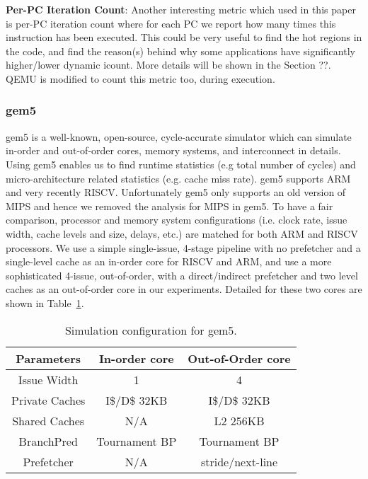 \noindent \textbf{Per-PC Iteration Count}: Another interesting metric which used in this paper is per-PC iteration count where for each PC we report how many times this instruction has been executed. This could be very useful to find the hot regions in the code, and find the reason(s) behind why some applications have significantly higher/lower dynamic icount. More details will be shown in the Section ??. QEMU is modified to count this metric too, during execution. 

\subsubsection{gem5}
gem5 is a well-known, open-source, cycle-accurate simulator which can simulate in-order and out-of-order cores, memory systems, and interconnect in details. Using gem5 enables us to find runtime statistics (e.g total number of cycles) and micro-architecture related statistics (e.g. cache miss rate). gem5 supports ARM and very recently RISCV. Unfortunately gem5 only supports an old version of MIPS and hence we removed the analysis for MIPS in gem5. To have a fair comparison, processor and memory system configurations (i.e. clock rate, issue width, cache levels and size, delays, etc.) are matched for both ARM and RISCV processors. We use a simple single-issue, 4-stage pipeline with no prefetcher and a single-level cache as an in-order core for RISCV and ARM, and use a more sophisticated 4-issue, out-of-order, with a direct/indirect prefetcher and two level caches as an out-of-order core in our experiments. Detailed for these two cores are shown in Table~\ref{t:config}.

\begin{table}[h]
\centering
\caption{Simulation configuration for gem5.}
\begin{tabular}{|c|c|c|}
\hline
\small \textbf{Parameters} &\small \textbf{In-order core} &\small \textbf{Out-of-Order core} \\
\hline \hline
\small Issue Width & \small 1 & \small 4 \\
\hline
\small Private Caches & \small I\$/D\$ 32KB & \small I\$/D\$ 32KB\\
\hline
\small Shared Caches & \small N/A & \small L2 256KB \\
\hline
\small BranchPred & \small Tournament BP & \small Tournament BP\\
\hline
\small Prefetcher & \small N/A & \small stride/next-line \\
\hline
\end{tabular}
\label{t:config}
\end{table}

